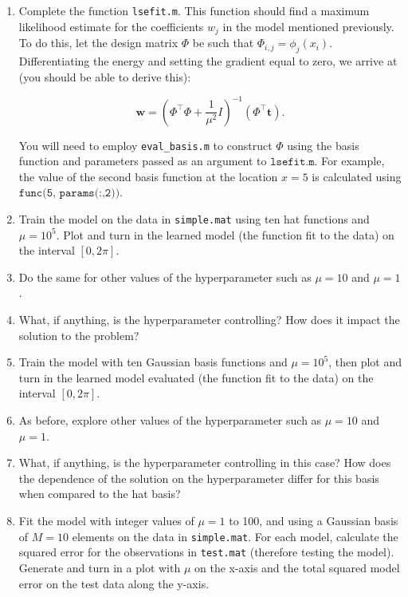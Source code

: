 \documentclass[11pt,noanswers,addpoints]{exam}
\begin{document}
\begin{enumerate}
\item Complete the function \texttt{lsefit.m}. This function should find a maximum likelihood
estimate for the coefficients $w_j$ in the model mentioned previously. To do this, let the design matrix $\Phi$ be such that
$\Phi_{i,j} = \phi_j(x_i)$. Differentiating the energy and setting the gradient equal to zero, we arrive at (you should
be able to derive this):

$$\mathbf w = \left(\Phi^\top\Phi + \frac{1}{\mu^2}I\right)^{-1}\left(\Phi^\top \mathbf t\right).$$

You will need to employ \texttt{eval\_basis.m} to construct $\Phi$ using the basis function and parameters passed as an argument to
$\texttt{lsefit.m}$. For example, the value of the second basis function
at the location $x = 5$ is calculated using $\texttt{func(5, params(:,2))}$.

\item Train the model on the data in \texttt{simple.mat} using ten hat functions and $\mu = 10^{5}$. 
Plot and turn in the learned model (the function fit to the data) on the interval $[0,2\pi]$.

\item Do the same for other values of the hyperparameter such as $\mu = 10$ and $\mu = 1$. 

\item What, if anything, is the hyperparameter controlling? How does it impact the solution to
the problem?

\item  Train the model with ten Gaussian basis functions and $\mu = 10^{5}$, then plot and
turn in the learned model evaluated (the function fit to the data) on the interval $[0, 2\pi]$.

\item As before, explore other values of the hyperparameter such as $\mu = 10$ and $\mu = 1$. 

\item What, if anything, is the hyperparameter controlling in this case? How does the dependence of
the solution on the hyperparameter differ for this basis when compared to the hat basis?

\item Fit the model with integer values of $\mu=1$ to 100, and using a Gaussian basis of $M=10$
elements on the data in \texttt{simple.mat}. For each model, 
calculate the squared error for the observations in \texttt{test.mat} (therefore 
testing the model). Generate and turn in a plot with $\mu$ on the x-axis and the total squared model error on
the test data along the y-axis. 


\end{enumerate}
\end{document}
